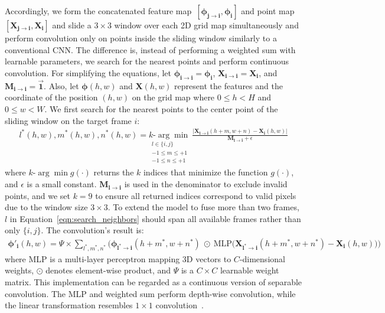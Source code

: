 Accordingly, we form the concatenated feature map~$[\boldsymbol{\phi_{j \rightarrow i}},\boldsymbol{\phi_{i}}]$ and point map~$[\boldsymbol{X_{j \rightarrow i}},\boldsymbol{X_{i}}]$ and slide a $3\times3$ window over each 2D grid map simultaneously and perform convolution only on points inside the sliding window similarly to a conventional CNN. The difference is, instead of performing a weighted sum with learnable parameters, we search for the nearest points and perform continuous convolution. For simplifying the equations, let $\boldsymbol{\phi_{i \rightarrow i}}=\boldsymbol{\phi_{i}}$, $\boldsymbol{X_{i \rightarrow i}}=\boldsymbol{X_{i}}$, and $\boldsymbol{M_{i \rightarrow i}}=\vec{\mathbf{1}}$. Also, let $\boldsymbol{\phi}(h,w)$ and $\boldsymbol{X}(h,w)$ represent the features and the coordinate of the position $(h,w)$ on the grid map where $0 \le h < H$ and $0 \le w < W$. We first search for the nearest points to the center point of the sliding window on the target frame $i$:
\begin{align} \label{eqn:search_neighbors}
l^*(h,w),m^*(h,w),n^*(h,w) = \underset{\substack{l \in \{i,j\} \\ -1\le m \le +1 \\ -1 \le n \le +1}}{\textit{k-}\!\arg\min} \
\frac{\big| \boldsymbol{X_{l \rightarrow i}}(h+m,w+n) - \boldsymbol{X_{i}}(h,w)\big|}{\boldsymbol{M_{l \rightarrow i}} + \epsilon}
\end{align}
where $\textit{k-}\!\arg\min g(\cdot)$ returns the $k$ indices that minimize the function $g(\cdot)$, and $\epsilon$ is a small constant. $\boldsymbol{M_{l \rightarrow i}}$ is used in the denominator to exclude invalid points, and we set $k=9$ to ensure all returned indices correspond to valid pixels due to the window size $3 \times 3$. To extend the model to fuse more than two frames, $l$ in Equation~\eqref{eqn:search_neighbors} should span all available frames rather than only $\{i,j\}$. The convolution's result is:
\begin{align}
\boldsymbol{\phi'_{i}}(h,w)= \Psi \times \! \! \! \! \sum_{l^*,m^*,n^*} \! \! \!
\Big( \! \boldsymbol{\phi_{l^* \rightarrow i}}(h+m^*,w+n^*) \ \odot \ \text{MLP}\big(\boldsymbol{X_{l^* \rightarrow i}}(h+m^*,w+n^*) - \boldsymbol{X_{i}}(h,w)\big) \Big)
\end{align}
where MLP is a multi-layer perceptron mapping 3D vectors to $C$-dimensional weights, $\odot$ denotes element-wise product, and $\Psi$ is a $C \times C$ learnable weight matrix. This implementation can be regarded as a continuous version of separable convolution. The MLP and weighted sum perform depth-wise convolution, while the linear transformation resembles $1 \times 1$ convolution~\citep{chen2019learning}.

